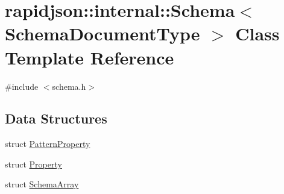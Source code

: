 \hypertarget{classrapidjson_1_1internal_1_1_schema}{}\section{rapidjson\+::internal\+::Schema$<$ Schema\+Document\+Type $>$ Class Template Reference}
\label{classrapidjson_1_1internal_1_1_schema}


{\ttfamily \#include $<$schema.\+h$>$}

\subsection*{Data Structures}
\begin{DoxyCompactItemize}
\item 
struct \mbox{\hyperlink{structrapidjson_1_1internal_1_1_schema_1_1_pattern_property}{Pattern\+Property}}
\item 
struct \mbox{\hyperlink{structrapidjson_1_1internal_1_1_schema_1_1_property}{Property}}
\item 
struct \mbox{\hyperlink{structrapidjson_1_1internal_1_1_schema_1_1_schema_array}{Schema\+Array}}
\end{DoxyCompactItemize}
